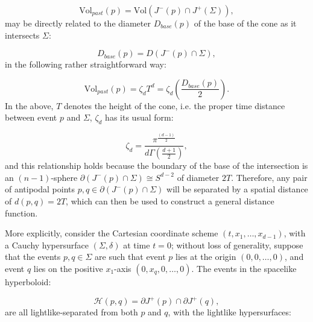 \documentclass{article}
\begin{document}
\begin{equation}
\mathrm{Vol}_{past} \left( p \right) = \mathrm{Vol} \left( J^{-} \left( p \right) \cap J^{+} \left( \Sigma \right) \right),
\end{equation}
may be directly related to the diameter ${D_{base} \left( p \right)}$ of the base of the cone as it intersects ${\Sigma}$:

\begin{equation}
D_{base} \left( p \right) = D \left( J^{-} \left( p \right) \cap \Sigma \right),
\end{equation}
in the following rather straightforward way:

\begin{equation}
\mathrm{Vol}_{past} \left( p \right) = \zeta_d T^d = \zeta_d \left( \frac{D_{base} \left( p \right)}{2} \right).
\end{equation}
In the above, $T$ denotes the height of the cone, i.e. the proper time distance between event $p$ and ${\Sigma}$, ${\zeta_d}$ has its usual form:

\begin{equation}
\zeta_d = \frac{\pi^{\frac{\left( d - 1 \right)}{2}}}{d \Gamma \left( \frac{d + 1}{2} \right)},
\end{equation}
and this relationship holds because the boundary of the base of the intersection is an ${\left( n - 1 \right)}$-sphere ${\partial \left( J^{-} \left( p \right) \cap \Sigma \right) \cong S^{d - 2}}$ of diameter ${2 T}$. Therefore, any pair of antipodal points ${p, q \in \partial \left( J^{-} \left( p \right) \cap \Sigma \right)}$ will be separated by a spatial distance of ${d \left( p, q \right) = 2T}$, which can then be used to construct a general distance function.

More explicitly, consider the Cartesian coordinate scheme ${\left( t, x_1, \dots, x_{d - 1} \right)}$, with a Cauchy hypersurface ${\left( \Sigma, \delta \right)}$ at time ${t = 0}$; without loss of generality, suppose that the events ${p, q \in \Sigma}$ are such that event $p$ lies at the origin ${\left( 0, 0, \dots, 0 \right)}$, and event $q$ lies on the positive ${x_1}$-axis ${\left( 0, x_q, 0, \dots, 0 \right)}$. The events in the spacelike hyperboloid:

\begin{equation}
\mathcal{H} \left( p, q \right) = \partial J^{+} \left( p \right) \cap \partial J^{+} \left( q \right),
\end{equation}
are all lightlike-separated from both $p$ and $q$, with the lightlike hypersurfaces:
\end{document}
